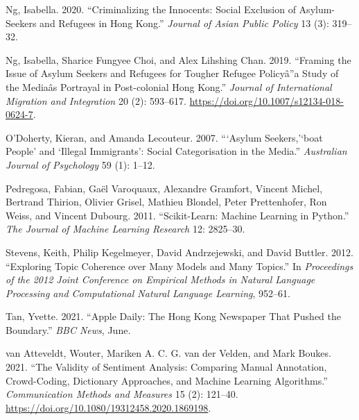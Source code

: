 \documentclass[a4paper, oneside]{report}
\begin{document}
\begin{CSLReferences}{1}{0}
\leavevmode{}%
Ng, Isabella. 2020. {``Criminalizing the Innocents: Social Exclusion of
Asylum-Seekers and Refugees in {Hong Kong}.''} \emph{Journal of Asian
Public Policy} 13 (3): 319--32.

\leavevmode{}%
Ng, Isabella, Sharice Fungyee Choi, and Alex Lihshing Chan. 2019.
{``Framing the {Issue} of {Asylum Seekers} and {Refugees} for {Tougher
Refugee Policyâ}\texteuro ''a {Study} of the
{Mediaâ}\texteuro\texttrademark s {Portrayal} in {Post-colonial Hong
Kong}.''} \emph{Journal of International Migration and Integration} 20
(2): 593--617. \url{https://doi.org/10.1007/s12134-018-0624-7}.

\leavevmode{}%
O'Doherty, Kieran, and Amanda Lecouteur. 2007. {``{`{Asylum}
Seekers,'}{`boat People'} and {`Illegal Immigrants'}: {Social}
Categorisation in the Media.''} \emph{Australian Journal of Psychology}
59 (1): 1--12.

\leavevmode{}%
Pedregosa, Fabian, Gaël Varoquaux, Alexandre Gramfort, Vincent Michel,
Bertrand Thirion, Olivier Grisel, Mathieu Blondel, Peter Prettenhofer,
Ron Weiss, and Vincent Dubourg. 2011. {``Scikit-Learn: {Machine}
Learning in {Python}.''} \emph{The Journal of Machine Learning Research}
12: 2825--30.

\leavevmode{}%
Stevens, Keith, Philip Kegelmeyer, David Andrzejewski, and David
Buttler. 2012. {``Exploring Topic Coherence over Many Models and Many
Topics.''} In \emph{Proceedings of the 2012 Joint Conference on
Empirical Methods in Natural Language Processing and Computational
Natural Language Learning}, 952--61.

\leavevmode{}%
Tan, Yvette. 2021. {``Apple {Daily}: {The Hong Kong} Newspaper That
Pushed the Boundary.''} \emph{BBC News}, June.

\leavevmode{}%
van Atteveldt, Wouter, Mariken A. C. G. van der Velden, and Mark Boukes.
2021. {``The {Validity} of {Sentiment Analysis}: {Comparing Manual
Annotation}, {Crowd-Coding}, {Dictionary Approaches}, and {Machine
Learning Algorithms}.''} \emph{Communication Methods and Measures} 15
(2): 121--40. \url{https://doi.org/10.1080/19312458.2020.1869198}.

\end{CSLReferences}
\end{document}
